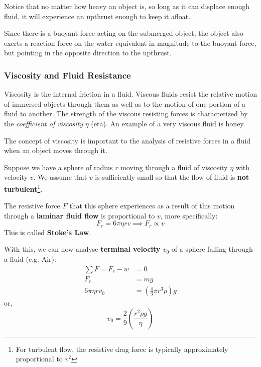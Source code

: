 \documentclass[11pt]{article}
\numberwithin{equation}{section}
\begin{document}
			Notice that no matter how heavy an object is, so long as it can displace enough fluid, it will experience an upthrust enough to keep it afloat.
			
			Since there is a buoyant force acting on the submerged object, the object also exerts a reaction force on the water equivalent in magnitude to the buoyant force, but pointing in the opposite direction to the upthrust. 
			\subsubsection{Viscosity and Fluid Resistance}
			Viscosity is the internal friction in a fluid. Viscous fluids resist the relative motion of immersed objects through them as well as to the motion of one portion of a fluid to another. The strength of the viscous resisting forces is characterized by the \textit{coefficient of viscosity} $\eta$ (eta). An example of a very viscous fluid is honey.
			
			The concept of viscosity is important to the analysis of resistive forces in a fluid when an object moves through it.
			
			Suppose we have a sphere of radius $r$ moving through a fluid of viscosity $\eta$ with velocity $v$. We assume that $v$ is sufficiently small so that the flow of fluid is \textbf{not turbulent}\footnote{For turbulent flow, the resistive drag force is typically approximately proportional to $v^2$}. 
			
			\vfill
			\begin{shaded}
			The resistive force $F$ that this sphere experiences as a result of this motion through a \textbf{laminar fluid flow} is proportional to $v$, more specifically: 			
				\begin{equation}
				F_r = 6\pi \eta r v \implies F_r \propto v
				\end{equation}
				This is called \textbf{Stoke's Law}.
			\end{shaded}
			\vfill
			\pagebreak
			
			With this, we can now analyse \textbf{terminal velocity $v_0$} of a sphere falling through a fluid (e.g. Air):
			\begin{align*}
				\sum F = F_r - w &= 0 \\
				F_r &= mg \\
				6\pi \eta r v_0 &= \left(\frac{4}{3}\pi r^3 \rho \right)g
			\end{align*}
			or,
			\begin{equation*}
				v_0 = \frac{2}{9} \left(\frac{r^2\rho g}{\eta}\right)
			\end{equation*}
			
\end{document}
